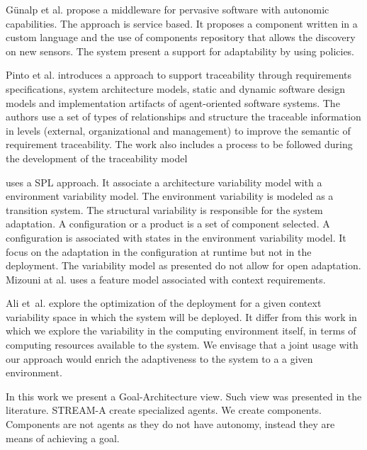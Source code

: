 Günalp et al. \cite{gunalp_autonomic_2012}\citep{gunalp_rondo_2015} propose a middleware for pervasive software with autonomic capabilities. The approach is service based. It proposes a component written in a custom language and the use of components repository that allows the discovery on new sensors. The system present a support for adaptability by using policies.

Pinto et al. \cite{pinto_process_2005} introduces a approach to support traceability through requirements specifications, system architecture models, static and dynamic software design models and implementation artifacts of agent-oriented software systems.
The authors use a set of types of relationships and structure the traceable information in levels (external, organizational and management) to improve the semantic of requirement traceability.
The work also includes a process to be followed during the development of the traceability model

\cite{bencomo_dynamically_2008} uses a SPL approach. It associate a architecture variability model with a environment variability model. The environment variability is modeled as a transition system. The structural variability is responsible for the system adaptation. A configuration or a product is a set of component selected. A configuration is associated with states in the environment variability model. It focus on the adaptation in the configuration at runtime but not in the deployment. The variability model as presented do not allow for open adaptation. Mizouni at al. \citep{mizouni_framework_2014} uses a feature model associated with context requirements.

Ali et~al.\cite{ali_requirements-driven_2014} explore the optimization of the deployment for a given context variability space in which the system will be deployed. It differ from this work in which we explore the variability in the computing environment itself, in terms of computing resources available to the system. We envisage that a joint usage with our approach would enrich the adaptiveness to the system to a a given environment.

In this work we present a Goal-Architecture view. Such view was presented in the literature. STREAM-A\cite{pimentel_deriving_2012} create specialized agents. We create components. Components are not agents as they do not have autonomy, instead they are means of achieving a goal.

